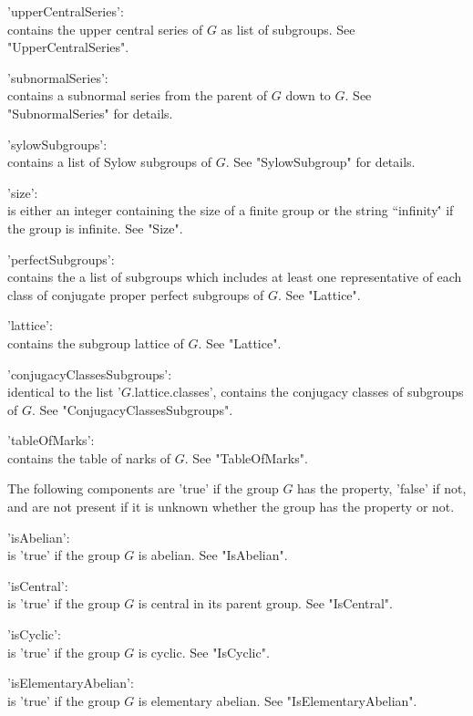 'upperCentralSeries': \\
        contains the  upper central series  of $G$ as  list of subgroups.
        See "UpperCentralSeries".

'subnormalSeries': \\
        contains  a  subnormal series  from  the   parent of  $G$ down to
        $G$.  See "SubnormalSeries" for details.

'sylowSubgroups': \\
        contains a list of  Sylow subgroups  of $G$.  See "SylowSubgroup"
        for details.

'size': \\
        is either an integer containing the size of a finite group or the
        string {``infinity\'\'} if the group is infinite. See "Size".

'perfectSubgroups': \\
        contains  the a  list of  subgroups  which includes at  least one
        representative   of  each  class   of  conjugate  proper  perfect
        subgroups of $G$. See "Lattice".

'lattice': \\
        contains the subgroup lattice of $G$. See "Lattice".

'conjugacyClassesSubgroups': \\
        identical  to   the  list  '$G$.lattice.classes',   contains  the
        conjugacy    classes     of     subgroups     of     $G$.     See
        "ConjugacyClassesSubgroups".

'tableOfMarks': \\
        contains the table of narks of $G$. See "TableOfMarks".

The following components are  'true' if  the group  $G$ has the property,
'false' if  not, and are not present  if it is unknown whether  the group
has the property or not.

'isAbelian': \\
        is 'true' if the group $G$ is abelian. See "IsAbelian".

'isCentral': \\
        is  'true'  if  the  group   $G$    is  central in   its   parent
        group.  See "IsCentral".

'isCyclic': \\
        is 'true' if the group $G$ is cyclic. See "IsCyclic".

'isElementaryAbelian': \\
        is  'true'  if   the  group  $G$    is   elementary  abelian. See
        "IsElementaryAbelian".

